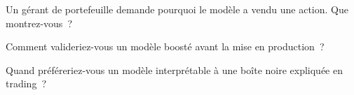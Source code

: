 \begin{interviewq}\label{iq:ml:interpretability-and-model-governance:4}
Un gérant de portefeuille demande pourquoi le modèle a vendu une action. Que montrez-vous~?
\end{interviewq}

\begin{interviewq}\label{iq:ml:interpretability-and-model-governance:5}
Comment valideriez-vous un modèle boosté avant la mise en production~?
\end{interviewq}

\begin{interviewq}\label{iq:ml:interpretability-and-model-governance:6}
Quand préféreriez-vous un modèle interprétable à une boîte noire expliquée en trading~?
\end{interviewq}
